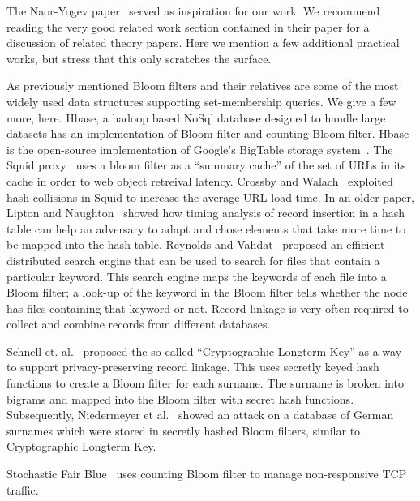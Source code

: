 The Naor-Yogev paper~\cite{naor15bloom} served as inspiration for our work.  We recommend reading the very good related work section contained in their paper for a discussion of related theory papers.  Here we mention a few additional practical works, but stress that this only scratches the surface.

As previously mentioned Bloom filters and their relatives are some of the most widely used data structures supporting set-membership queries.  We give a few more, here. Hbase, a hadoop based NoSql database designed to handle large datasets has an implementation of Bloom filter and counting Bloom filter. Hbase is the open-source implementation of Google's BigTable storage system~\cite{chang2008bigtable}. 
The Squid proxy~\cite{fan2000summary} uses a bloom filter as a ``summary cache'' of the set of URLs in its cache in order to web object retreival latency.   Crossby and Walach~\cite{crosby2003denial} exploited hash collisions in Squid to increase the average URL load time.  In an older paper, Lipton and Naughton~\cite{lipton1993clocked} showed how timing analysis of record insertion in a hash table can help an adversary to adapt and chose elements that take more time to be mapped into the hash table. Reynolds and Vahdat~\cite{reynolds2003efficient} proposed an efficient distributed search engine that can be used to search for files that contain a particular keyword. This search engine maps the keywords of each file into a Bloom filter; a look-up of the keyword in the Bloom filter tells whether the node has files containing that keyword or not. Record linkage is very often required to collect and combine records from different databases.

Schnell et. al.~\cite{schnell2011novel} proposed the so-called ``Cryptographic Longterm Key'' as a way to support privacy-preserving record linkage. This uses secretly keyed hash functions to create a Bloom filter for each surname. The surname is broken into bigrams and mapped into the Bloom filter with secret hash functions.  Subsequently, Niedermeyer et al.~\cite{niedermeyer2014cryptanalysis} showed an attack on a database of German surnames which were stored in secretly hashed Bloom filters, similar to Cryptographic Longterm Key.

Stochastic Fair Blue~\cite{feng2001stochastic} uses counting Bloom filter to manage non-responsive TCP traffic. 

